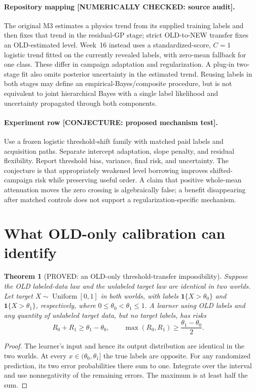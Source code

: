 \documentclass[11pt]{article}
\newtheorem{theorem}{Theorem}[section]
\theoremstyle{definition}
\theoremstyle{remark}
\begin{document}
\paragraph{Repository mapping [NUMERICALLY CHECKED: source audit].}
The original M3 estimates a physics trend from its supplied training
labels and then fixes that trend in the residual-GP stage; strict
OLD-to-NEW transfer fixes an OLD-estimated level.  Week~16 instead uses
a standardized-score, $C=1$ logistic trend fitted on the currently
revealed labels, with zero-mean fallback for one class.  These differ
in campaign adaptation and regularization.  A plug-in two-stage fit also
omits posterior uncertainty in the estimated trend.  Reusing labels in
both stages may define an empirical-Bayes/composite procedure, but is
not equivalent to joint hierarchical Bayes with a single label
likelihood and uncertainty propagated through both components.

\paragraph{Experiment row [CONJECTURE: proposed mechanism test].}
Use a frozen logistic threshold-shift family with matched paid labels
and acquisition paths.  Separate intercept adaptation, slope penalty,
and residual flexibility.  Report threshold bias, variance, final risk,
and uncertainty.  The conjecture is that appropriately weakened level
borrowing improves shifted-campaign risk while preserving useful order.
A claim that positive whole-mean attenuation moves the zero crossing is
algebraically false; a benefit disappearing after matched controls does
not support a regularization-specific mechanism.

\section{What OLD-only calibration can identify}

\begin{theorem}[PROVED: an OLD-only threshold-transfer impossibility]
Suppose the OLD labeled-data law and the unlabeled target law are
identical in two worlds.  Let target $X\sim\operatorname{Uniform}[0,1]$
in both worlds, with labels $\mathbf{1}\{X>\theta_0\}$ and
$\mathbf{1}\{X>\theta_1\}$, respectively, where
$0\leq\theta_0<\theta_1\leq1$.  A learner using OLD labels and any
quantity of unlabeled target data, but no target labels, has risks
\[
 R_0+R_1\geq\theta_1-\theta_0,
 \qquad \max(R_0,R_1)\geq\frac{\theta_1-\theta_0}{2}.
\]
\end{theorem}
\begin{proof}
The learner's input and hence its output distribution are identical in
the two worlds.  At every $x\in(\theta_0,\theta_1]$ the true labels are
opposite.  For any randomized prediction, its two error probabilities
there sum to one.  Integrate over the interval and use nonnegativity of
the remaining errors.  The maximum is at least half the sum.
\end{proof}
\end{document}
